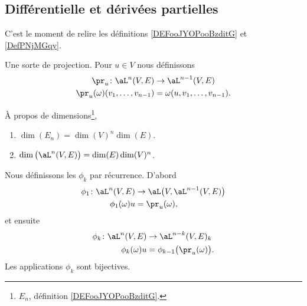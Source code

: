 \subsection{Différentielle et dérivées partielles}

C'est le moment de relire les définitions \ref{DEFooJYOPooBzditG} et \ref{DefPNjMGqy}.

\begin{definition}
	Une sorte de projection. Pour \( u\in V\) nous définissons
	\begin{equation}
		\begin{aligned}
			\pr_u\colon \aL^n(V,E)             & \to \aL^{n-1}(V,E)              \\
			\pr_u(\omega)(v_1,\ldots, v_{n-1}) & =\omega(u,v_1,\ldots, v_{n-1}).
		\end{aligned}
	\end{equation}
\end{definition}

\begin{lemma}      \label{LEMooSMZQooJBVySP}
	À propos de dimensions\footnote{\( E_n\), définition \ref{DEFooJYOPooBzditG}.},
	\begin{enumerate}
		\item       \label{ITEMooUWEBooSzFseN}
		      \( \dim(E_n)=\dim(V)^n\dim(E)\).
		\item       \label{ITEMooFMKQooFSMpgF}
		      \( \dim\big( \aL^n(V,E) \big)=\dim(E)\dim(V)^n\).
	\end{enumerate}
\end{lemma}

\begin{lemma}        \label{LEMooTDLNooTcPkLg}
	Nous définissons les \( \phi_k\) par récurrence. D'abord
	\begin{equation}
		\begin{aligned}
			\phi_1\colon \aL^n(V,E) & \to \aL\big( V,\aL^{n-1}(V,E) \big) \\
			\phi_1(\omega)u         & =\pr_u(\omega),
		\end{aligned}
	\end{equation}
	et ensuite
	\begin{equation}
		\begin{aligned}
			\phi_k\colon \aL^n(V,E) & \to \aL^{n-k}(V,E)_{k}                \\
			\phi_k(\omega)u         & =\phi_{k-1}\big( \pr_u(\omega) \big).
		\end{aligned}
	\end{equation}
	Les applications \( \phi_k\) sont bijectives.
\end{lemma}

